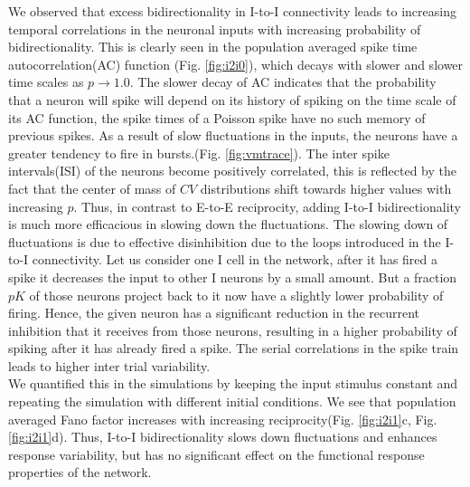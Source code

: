 We observed that excess bidirectionality in I-to-I connectivity leads to increasing temporal correlations in the neuronal inputs with increasing probability of bidirectionality. This is clearly seen in the population averaged spike time autocorrelation(AC) function (Fig. \ref{fig:i2i0}), which decays with slower and slower time scales as $p \rightarrow 1.0$. The slower decay of AC indicates that the probability that a neuron will spike will depend on its history of spiking on the time scale of its AC function, the spike times of a Poisson spike have no such memory of previous spikes. As a result of slow fluctuations in the inputs, the neurons have a greater tendency to fire in bursts.(Fig. \ref{fig:vmtrace}). The inter spike intervals(ISI) of the neurons become positively correlated, this is reflected by the fact that the center of mass of $CV$ distributions shift towards higher values with increasing $p$. Thus, in contrast to E-to-E reciprocity, adding I-to-I bidirectionality is much more efficacious in slowing down the fluctuations. The slowing down of fluctuations is due to effective disinhibition due to the loops introduced in the I-to-I connectivity. Let us consider one I cell in the network, after it has fired a spike it decreases the input to other I neurons by a small amount. But a fraction $pK$ of those neurons project back to it now  have a slightly lower probability of firing. Hence, the given neuron has a significant reduction in the recurrent inhibition that it receives from those neurons, resulting in a higher probability of spiking after it has already fired a spike. The serial correlations in the spike train leads to higher inter trial variability.     \\ 


We quantified this in the simulations by keeping the input stimulus constant and repeating the simulation with different initial conditions. We see that population averaged Fano factor increases with increasing reciprocity(Fig. \ref{fig:i2i1}c, Fig. \ref{fig:i2i1}d). Thus, I-to-I bidirectionality slows down fluctuations and enhances response variability, but has no significant effect on the functional response properties of the network. 

